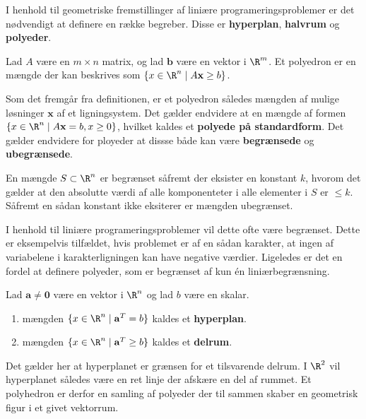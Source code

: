 I henhold til geometriske fremstillinger af liniære programeringsproblemer er det nødvendigt at definere en række begreber.
Disse er \textbf{hyperplan}, \textbf{halvrum} og \textbf{polyeder}.
%
\begin{defn}{}{}
Lad $A$ være en $m \times n$ matrix, og lad $\mathbf{b}$ være en vektor i  $\R^m$.
Et polyedron er en mængde der kan beskrives som $\{x\in \R^n \mid A\mathbf{x}\geq b\}$.
\end{defn}\noindent
%
Som det fremgår fra definitionen, er et polyedron således mængden af mulige løsninger $\mathbf{x}$ af et ligningsystem.
Det gælder endvidere at en mængde af formen $ \{x \in \R^n \mid A\textbf{x}=b,x \geq 0 \}$, hvilket kaldes et \textbf{polyede på standardform}. 
Det gælder endvidere for ployeder at dissse både kan være \textbf{begrænsede} og \textbf{ubegrænsede}.
%
\begin{defn}{}{}
En mængde $S \subset \R^n$ er begrænset såfremt der eksister en konstant $k$, hvorom det gælder at den absolutte værdi af alle komponenteter i alle elementer i $S$ er $\leq k$. 
Såfremt en sådan konstant ikke eksiterer er mængden ubegrænset. 
\end{defn}\noindent
I henhold til liniære programeringsproblemer vil dette ofte være begrænset.
Dette er eksempelvis tilfældet, hvis problemet er af en sådan karakter, at ingen af variabelene i karakterligningen kan have negative værdier.
Ligeledes er det en fordel at definere polyeder, som er begrænset af kun én liniærbegrænsning. 
\begin{defn}{}{}
Lad $\mathbf{a} \neq \mathbf{0}$ være en vektor i $\R^n$ og lad $b$ være en skalar.
\begin{enumerate}[label=(\alph*)]
\item mængden $\{x \in \R^n \mid \mathbf{a}^T=b\}$ kaldes et \textbf{hyperplan}.
\item mængden $\{x \in \R^n \mid \mathbf{a}^T \geq b\}$ kaldes et \textbf{delrum}.
\end{enumerate}
\end{defn}\noindent
Det gælder her at hyperplanet er grænsen for et tilsvarende delrum.
I $\R^2$ vil hyperplanet således være en ret linje der afskære en del af rummet.
Et polyhedron er derfor en samling af polyeder der til sammen skaber en geometrisk figur i et givet vektorrum.
